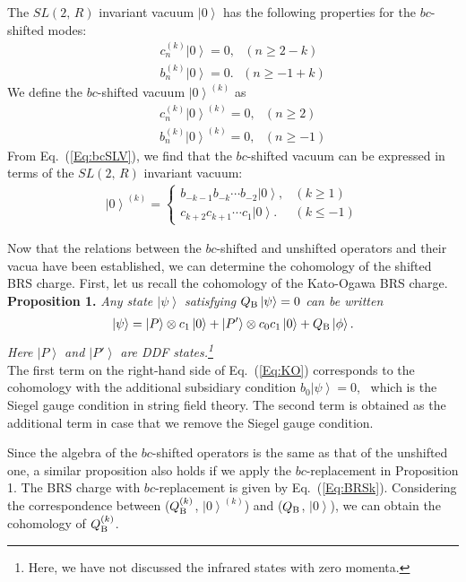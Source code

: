 \documentclass[a4paper,seceq,preprint]{ptptex}
\newcommand{\nn}{\nonumber\\}
\newcommand{\ket}[1]{\left| #1 \right>}
\newcommand{\Q}{Q_{\rm B}}
\begin{document}
The $SL(2,\,R)$ invariant vacuum $\ket{0}$ has the following properties
for the $bc$-shifted modes:
\begin{eqnarray}
\label{Eq:bcSLV}
&& c_n^{(k)}\ket{0} = 0,\ \ \ (n\geq 2-k)\nn
&& b_n^{(k)}\ket{0} = 0.\ \ \ (n\geq -1+k)
\end{eqnarray}
We define the $bc$-shifted vacuum $\ket{0}^{(k)}$ as
\begin{eqnarray}
 && c_n^{(k)}\ket{0}^{(k)} = 0,\ \ \ (n\geq 2)\\
&& b_n^{(k)}\ket{0}^{(k)} = 0,\ \ \ (n\geq -1)
\end{eqnarray}
From Eq.~(\ref{Eq:bcSLV}), we find that the $bc$-shifted vacuum
can be expressed in terms of the $SL(2,\,R)$ invariant vacuum:
\begin{eqnarray}
 \ket{0}^{(k)} = 
\left\{
\begin{array}{ll}
 b_{-k-1} b_{-k}\cdots b_{-2} \ket{0},& (k\geq 1)\\
 c_{k+2} c_{k+1}\cdots c_{1} \ket{0}.& (k\leq -1)
\end{array}
\right.
\end{eqnarray}

Now that the relations between the $bc$-shifted and unshifted operators
and their vacua have been established, we can determine the cohomology of the
shifted BRS charge. First, let us recall the cohomology of the
Kato-Ogawa BRS charge.\cite{rf:KO,rf:Henneaux,rf:FGZ}
\\

\noindent
{\bf Proposition 1.}
{\it Any state $\ket{\psi}$ satisfying $\Q\ket{\psi}=0$ 
can be written 
\begin{eqnarray}
\label{Eq:KO}
 \ket{\psi} = \ket{P}\otimes c_1 \ket{0} 
              +\ket{P'}\otimes c_0 c_1 \ket{0}
              +\Q\ket{\phi}.
\end{eqnarray}
Here $\ket{P}$ and $\ket{P'}$
are DDF states.\footnote{Here, we have not discussed the infrared states
with zero momenta.}
}
\\

The first term on the right-hand side of Eq.~(\ref{Eq:KO})
corresponds to the cohomology with the
additional subsidiary condition $b_0\ket{\psi} = 0$,~\cite{rf:KO} which
is the Siegel 
gauge condition in string field theory. The second term is obtained as the
additional term in case that we remove the Siegel gauge
condition.\cite{rf:Henneaux,rf:FGZ}

Since the algebra of the $bc$-shifted operators is the same as that of the
unshifted one, a similar proposition also holds if we apply
the $bc$-replacement in Proposition 1.
The BRS charge with $bc$-replacement is given by Eq.~(\ref{Eq:BRSk}).
Considering the correspondence between ($\Q^{(k)}$, $\ket{0}^{(k)}$) and
($\Q$, $\ket{0}$),
we can obtain the cohomology of $\Q^{(k)}$.
\\
\end{document}
